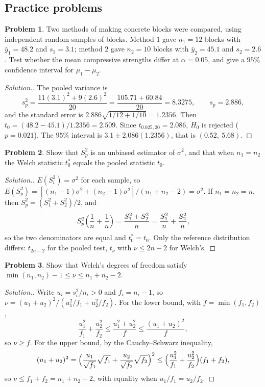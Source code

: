 \documentclass[11pt,a4paper]{article}
\numberwithin{equation}{section}
\theoremstyle{definition}
\newtheorem{problemx}{Problem}[subsection]
\newenvironment{problem}{\begin{problemx}}{\end{problemx}}
\newenvironment{solution}
  {\renewcommand{\qedsymbol}{}\begin{proof}[\textit{Solution}.]}
  {\end{proof}}
\begin{document}
\subsection{Practice problems}

\begin{problem}
Two methods of making concrete blocks were compared, using independent random samples of blocks. Method $1$ gave
$n_1 = 12$ blocks with $\bar y_1 = 48.2$ and $s_1 = 3.1$; method $2$ gave $n_2 = 10$ blocks with $\bar y_2 = 45.1$ and $s_2 = 2.6$. Test whether the mean compressive strengths
differ at $\alpha = 0.05$, and give a $95\%$ confidence interval for $\mu_1 - \mu_2$.
\end{problem}

\begin{solution}
The pooled variance is
\[
s_p^2 = \frac{11(3.1)^2 + 9(2.6)^2}{20} = \frac{105.71 + 60.84}{20} = 8.3275 , \qquad s_p = 2.886 ,
\]
and the standard error is $2.886\sqrt{1/12 + 1/10} = 1.2356$. Then $t_0 = (48.2 - 45.1)/1.2356 = 2.509$. Since $t_{0.025,20} = 2.086$, $H_0$ is rejected
($p = 0.021$). The $95\%$ interval is $3.1 \pm 2.086(1.2356)$, that is $(0.52,\ 5.68)$.
\end{solution}

\begin{problem}
Show that $S_p^2$ is an unbiased estimator of $\sigma^2$, and that when $n_1 = n_2$ the Welch statistic $t_0^*$ equals the pooled statistic $t_0$.
\end{problem}

\begin{solution}
$E(S_i^2) = \sigma^2$ for each sample, so $E(S_p^2) = [(n_1 - 1)\sigma^2 + (n_2 - 1)\sigma^2]/(n_1 + n_2 - 2) = \sigma^2$. If $n_1 = n_2 = n$, then $S_p^2 = (S_1^2 + S_2^2)/2$, and
\[
S_p^2\Bigl(\frac1n + \frac1n\Bigr) = \frac{S_1^2 + S_2^2}{n} = \frac{S_1^2}{n} + \frac{S_2^2}{n} ,
\]
so the two denominators are equal and $t_0^* = t_0$. Only the reference distribution differs: $t_{2n-2}$ for the pooled test, $t_\nu$ with $\nu \le 2n - 2$ for
Welch's.
\end{solution}

\begin{problem}
Show that Welch's degrees of freedom satisfy $\min(n_1, n_2) - 1 \le \nu \le n_1 + n_2 - 2$.
\end{problem}

\begin{solution}
Write $u_i = s_i^2/n_i > 0$ and $f_i = n_i - 1$, so $\nu = (u_1 + u_2)^2/(u_1^2/f_1 + u_2^2/f_2)$. For the lower bound, with $f = \min(f_1, f_2)$,
\[
\frac{u_1^2}{f_1} + \frac{u_2^2}{f_2} \le \frac{u_1^2 + u_2^2}{f} \le \frac{(u_1 + u_2)^2}{f} ,
\]
so $\nu \ge f$. For the upper bound, by the Cauchy--Schwarz inequality,
\[
(u_1 + u_2)^2 = \Bigl(\frac{u_1}{\sqrt{f_1}}\sqrt{f_1} + \frac{u_2}{\sqrt{f_2}}\sqrt{f_2}\Bigr)^2 \le \Bigl(\frac{u_1^2}{f_1} + \frac{u_2^2}{f_2}\Bigr)(f_1 + f_2) ,
\]
so $\nu \le f_1 + f_2 = n_1 + n_2 - 2$, with equality when $u_1/f_1 = u_2/f_2$.
\end{solution}
\end{document}
